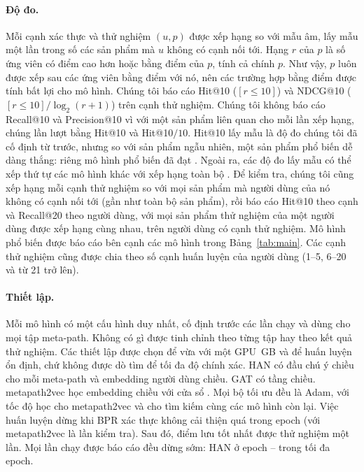 \paragraph{Độ đo.} Mỗi cạnh xác thực và thử nghiệm $(u, p)$ được xếp hạng so với
 mẫu âm, lấy mẫu một lần trong số các sản phẩm mà $u$ không có cạnh nối tới.     
Hạng $r$ của $p$ là số ứng viên có điểm cao hơn hoặc bằng điểm của $p$, tính cả chính $p$.
Như vậy, $p$ luôn được xếp sau các ứng viên bằng điểm với nó, nên các trường hợp bằng điểm
được tính bất lợi cho mô hình. Chúng tôi báo cáo Hit@10 ($[r \le 10]$) và NDCG@10
($[r \le 10] / \log_2(r + 1)$) trên  cạnh thử nghiệm. Chúng tôi không báo cáo
Recall@10 và Precision@10 vì với một sản phẩm liên quan cho mỗi lần xếp hạng, chúng lần lượt bằng
Hit@10 và Hit@10$/10$. Hit@10 lấy mẫu là độ đo chúng tôi đã cố
định từ trước, nhưng so với  sản phẩm ngẫu nhiên, một sản phẩm phổ biến dễ dàng
thắng: riêng mô hình phổ biến đã đạt . Ngoài ra, các độ đo lấy mẫu có thể xếp thứ tự các mô
hình khác với xếp hạng toàn bộ \citep{krichene2022sampled}. Để kiểm tra, chúng tôi cũng xếp hạng
mỗi cạnh thử nghiệm so với mọi sản phẩm mà người dùng của nó không có cạnh nối tới (gần như toàn bộ
 sản phẩm), rồi báo cáo Hit@10 theo cạnh và Recall@20 theo người dùng, với mọi sản
phẩm thử nghiệm của một người dùng được xếp hạng cùng nhau, trên  người dùng có
cạnh thử nghiệm. Mô hình phổ biến được báo cáo bên cạnh các mô hình trong Bảng~\ref{tab:main}.
Các cạnh thử nghiệm cũng được chia theo số cạnh huấn luyện của người dùng (1--5, 6--20 và từ 21 trở lên).

\paragraph{Thiết lập.} Mỗi mô hình có một cấu hình duy nhất, cố định trước các lần chạy và dùng cho
mọi tập meta-path. Không có gì được tinh chỉnh theo từng tập hay theo kết quả thử nghiệm. Các thiết
lập được chọn để vừa với một GPU \,GB và để huấn luyện ổn định, chứ không được dò
tìm để tối đa độ chính xác. HAN có  đầu chú ý  chiều
cho mỗi meta-path và embedding người dùng  chiều. GAT có 
tầng  chiều. metapath2vec học embedding  chiều với cửa sổ
. Mọi bộ tối ưu đều là Adam, với tốc độ học  cho metapath2vec
và  cho tìm kiếm cùng các mô hình còn lại. Việc huấn luyện dừng khi BPR xác thực
không cải thiện quá  trong  epoch
(với metapath2vec là  lần kiểm tra). Sau đó, điểm lưu tốt nhất được thử
nghiệm một lần. Mọi lần chạy được báo cáo đều dừng sớm: HAN ở epoch
-- trong tối đa  epoch.

